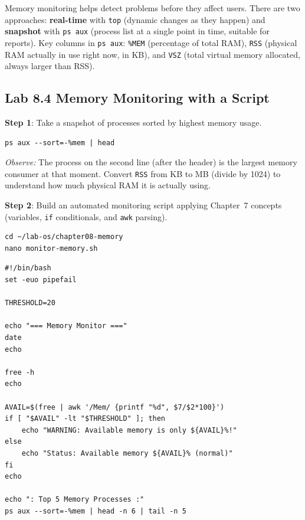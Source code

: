 Memory monitoring helps detect problems before they affect users. There are two
approaches: \textbf{real-time} with \texttt{top} (dynamic changes as they happen)
and \textbf{snapshot} with \texttt{ps aux} (process list at a single point in time,
suitable for reports). Key columns in \texttt{ps aux}: \texttt{\%MEM} (percentage
of total RAM), \texttt{RSS} (physical RAM actually in use right now, in KB), and
\texttt{VSZ} (total virtual memory allocated, always larger than RSS).

\subsection*{Lab 8.4 Memory Monitoring with a Script}

\textbf{Step 1}: Take a snapshot of processes sorted by highest memory usage.

\begin{lstlisting}[caption={Processes with the highest memory usage}]
ps aux --sort=-%mem | head
\end{lstlisting}

\textit{Observe:} The process on the second line (after the header) is the largest
memory consumer at that moment. Convert \texttt{RSS} from KB to MB (divide by 1024)
to understand how much physical RAM it is actually using.

\textbf{Step 2}: Build an automated monitoring script applying Chapter~7 concepts
(variables, \texttt{if} conditionals, and \texttt{awk} parsing).

\begin{lstlisting}[caption={Navigate to directory and open nano}]
cd ~/lab-os/chapter08-memory
nano monitor-memory.sh
\end{lstlisting}

\begin{lstlisting}[caption={Contents of monitor-memory.sh}]
#!/bin/bash
set -euo pipefail

THRESHOLD=20

echo "=== Memory Monitor ==="
date
echo

free -h
echo

AVAIL=$(free | awk '/Mem/ {printf "%d", $7/$2*100}')
if [ "$AVAIL" -lt "$THRESHOLD" ]; then
    echo "WARNING: Available memory is only ${AVAIL}%!"
else
    echo "Status: Available memory ${AVAIL}% (normal)"
fi
echo

echo ": Top 5 Memory Processes :"
ps aux --sort=-%mem | head -n 6 | tail -n 5
\end{lstlisting}

